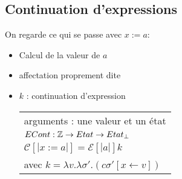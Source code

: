 \documentclass[10pt,a4paper]{article}
\newcommand{\semm}[1]{\left[| #1 | \right]}
\begin{document}
\subsection{Continuation d'expressions}
On regarde ce qui se passe avec $x:=a$:
\begin{itemize}
 \item Calcul de la valeur de $a$
 \item affectation proprement dite
 \item $k$ : continuation d'expression \begin{tabular}{l}
                                        arguments : une valeur et un état \\
					$ECont : \mathbb{Z} \rightarrow Etat \rightarrow Etat_{\perp}$\\
					$\mathcal{C}\semm{x:=a} = \mathcal{E}\semm{a} k$\\
					avec $k = \lambda v. \lambda \sigma' . (c \sigma'[x\leftarrow v])$
                                       \end{tabular}

\end{itemize}
\end{document}
